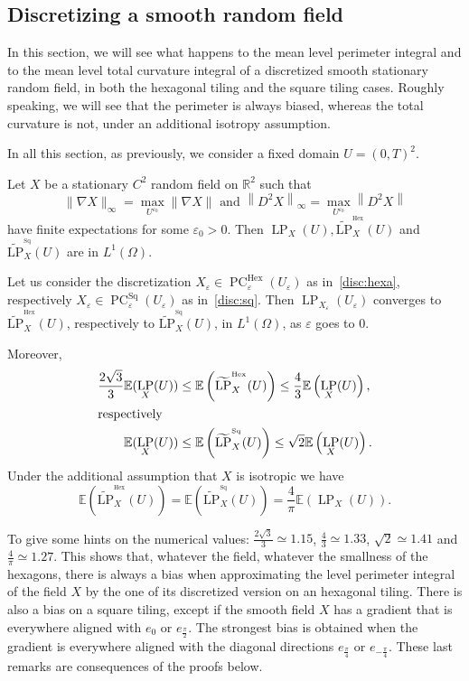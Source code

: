 \documentclass[AHL,Unicode,longabstracts,published]{cedram}
\newcommand{\R}{\mathbb{R}}
\newcommand{\E}{\mathbb{E}}
\newcommand{\eps}{\varepsilon}
\DeclareMathOperator{\LP}{LP}
\DeclareMathOperator{\PC}{PC}
\DeclareMathOperator{\Hex}{Hex}
\DeclareMathOperator{\Sq}{Sq}
\newcommand{\tLP}{\widetilde{\mathrm{LP}}}
\begin{document}
\subsection{Discretizing a smooth random field}

In this section, we will see what happens to the mean level perimeter integral and to the mean level total curvature integral of a discretized smooth stationary random field, in both the hexagonal tiling and the square tiling cases. Roughly speaking, we will see that the perimeter is always biased, whereas the total curvature is not, under an additional isotropy assumption. 


In all this section, as previously, we consider a fixed domain $U=(0,T)^2$.



\begin{prop}\label{cvgce:LP}
Let $X$ be a stationary $C^2$ random field on $\R^2$ such that \[
\|\nabla X\|_\infty=\underset{U^{\eps_0}}{\max}\|\nabla X\|\text{ and }\left\|D^2 X\right\|_\infty=\underset{U^{\eps_0}}{\max}\left\|D^2 X\right\|
\]
have finite expectations for some $\eps_0>0$. Then $\LP_X(U), \tLP^{^{\Hex}}_{X}(U)$ and $\tLP^{^{\Sq}}_{X}(U)$ are in $L^1(\Omega)$.


Let us consider the discretization $X_\eps \in \PC_\eps^{\Hex}(U_\eps)$ as in~\eqref{disc:hexa}, respectively $X_\eps \in \PC_\eps^{\Sq}(U_\eps)$ as in~\eqref{disc:sq}. Then $\LP_{X_\eps}(U_\eps)$ converges to $\tLP^{^{\Hex}}_{X}(U)$, respectively to $\tLP^{^{\Sq}}_{X}(U)$, in $L^1(\Omega)$, as $\eps$ goes to $0$.


Moreover,
\begin{align*}
\frac{2\sqrt{3}}{3} \E(\LP_{X}(U)) &\leq
\E\left(\tLP^{^{\Hex}}_{X}(U)\right) \leq \frac{4}{3} \E\left(\LP_{X}(U)\right),
\\
\intertext{respectively}
\E(\LP_{X}(U)) &\leq \E\left(\tLP^{^{\Sq}}_{X}(U)\right) \leq \sqrt{2} \E\left(\LP_{X}(U)\right).
\end{align*}
Under the additional assumption that $X$ is isotropic we have
\[
\E\left(\tLP^{^{\Hex}}_{X}(U)\right) = \E\left(\tLP^{^{\Sq}}_{X}(U)\right) =
\frac{4}{\pi} \E\left(\LP_{X}(U)\right).
\]
\end{prop}

To give some hints on the numerical values: $\tfrac{2\sqrt{3}}{3}\simeq 1.15$, $\tfrac{4}{3} \simeq 1.33$, $\sqrt{2} \simeq 1.41$ and $\tfrac{4}{\pi} \simeq 1.27$. This shows that, whatever the field, whatever the smallness of the hexagons, there is always a bias when approximating the level perimeter integral of the field $X$ by the one of its discretized version on an hexagonal tiling. There is also a bias on a square tiling, except if the smooth field $X$ has a gradient that is everywhere aligned with $e_0$ or $e_{\frac{\pi}{2}}$. The strongest bias is obtained when the gradient is everywhere aligned with the diagonal directions $e_{\frac{\pi}{4}}$ or $e_{-\frac{\pi}{4}}$. These last remarks are consequences of the proofs below.
\end{document}
